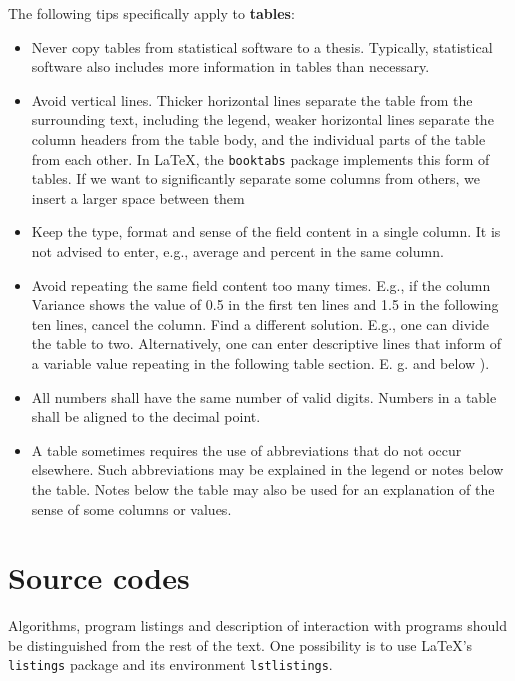 The following tips specifically apply to \textbf{tables}:

\begin{itemize} %

\item Never copy tables from statistical software to a thesis. Typically, 
statistical software also includes more information in tables than necessary.

\item Avoid vertical lines. Thicker horizontal lines separate the table from the 
surrounding text, including the legend, weaker horizontal lines separate the 
column headers from the table body, and the individual parts of the table from 
each other. In \LaTeX, the \texttt{booktabs} package implements this form of 
tables. If we want to significantly separate some columns from others, we insert 
a larger space between them

\item Keep the type, format and sense of the field content in a single column. 
It is not advised to enter, e.g., average and percent in the same column.

\item Avoid repeating the same field content too many times. E.g., if the column 
Variance shows the value of 0.5 in the first ten lines and 1.5 in the following 
ten lines, cancel the column. Find a different solution. E.g., one can divide 
the table to two. Alternatively, one can enter descriptive lines that inform of 
a variable value repeating in the following table section. E. g.
\emph{} and below \emph{}).

\item All numbers shall have the same number of valid digits. Numbers in a table 
shall be aligned to the decimal point.

\item A table sometimes requires the use of abbreviations that do not occur 
elsewhere. Such abbreviations may be explained in the legend or notes below the 
table. Notes below the table may also be used for an explanation of the sense of 
some columns or values.

\end{itemize}


\section{Source codes} 
Algorithms, program listings and description of 
interaction with programs should be distinguished from the rest of the text. One 
possibility is to use {\LaTeX}'s \texttt{listings} package and its environment 
\texttt{lstlistings}.

